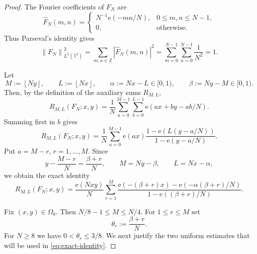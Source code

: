 \documentclass[10pt,a4paper]{amsart}
\begin{document}
\begin{proof}
The Fourier coefficients of $F_N$ are 
\begin{equation*}
\widehat F_N(m,n)= 
\begin{cases}
N^{-1}\mathrm{e}\!\left(-mn/N\right), & 0\le m,n\le N-1, \\ 
0, & \text{otherwise.}%
\end{cases}%
\end{equation*}
Thus Parseval's identity gives 
\begin{equation*}
\left\|F_N\right\|_{L^2(\mathbb{T}^2)}^2 =\sum_{m,n\in\mathbb{Z}%
}\left|\widehat F_N(m,n)\right|^2
=\sum_{m=0}^{N-1}\sum_{n=0}^{N-1}\frac1{N^2}=1.
\end{equation*}

Let 
\begin{equation*}
M:=\left\lfloor Ny\right\rfloor ,\qquad L:=\left\lfloor Nx\right\rfloor
,\qquad \alpha :=Nx-L\in \lbrack 0,1),\qquad \beta :=Ny-M\in \lbrack 0,1).
\end{equation*}%
Then, by the definition of the auxiliary sums $R_{M,L}$, 
\begin{equation}
R_{M,L}(F_{N};x,y)=\frac{1}{N}\sum_{a=0}^{M-1}\sum_{b=0}^{L-1}\mathrm{e}%
\!\left( ax+by-ab/N\right) .  \label{eq:R-first}
\end{equation}%
Summing first in $b$ gives 
\begin{equation*}
R_{M,L}(F_{N};x,y)=\frac{1}{N}\sum_{a=0}^{M-1}\mathrm{e}\!\left( ax\right) 
\frac{1-\mathrm{e}\!\left( L(y-a/N)\right) }{1-\mathrm{e}\!\left(
y-a/N\right) }.
\end{equation*}%
Put $a=M-r$, $r=1,\dots ,M$. Since 
\begin{equation*}
y-\frac{M-r}{N}=\frac{\beta +r}{N},\qquad M=Ny-\beta ,\qquad L=Nx-\alpha ,
\end{equation*}%
we obtain the exact identity 
\begin{equation}
R_{M,L}(F_{N};x,y)=\frac{\mathrm{e}\!\left( Nxy\right) }{N}\sum_{r=1}^{M}%
\frac{\mathrm{e}\!\left( -(\beta +r)x\right) -\mathrm{e}\!\left( -\alpha
(\beta +r)/N\right) }{1-\mathrm{e}\!\left( (\beta +r)/N\right) }.
\label{eq:exact-identity}
\end{equation}

Fix $(x,y)\in\Omega_0$. Then $N/8-1\le M\le N/4$. For $1\le r\le M$ set 
\begin{equation*}
\theta_r:=\frac{\beta+r}{N}.
\end{equation*}
For $N\ge8$ we have $0<\theta_r\le3/8$. We next justify the two uniform
estimates that will be used in \eqref{eq:exact-identity}.


\end{proof}
\end{document}
